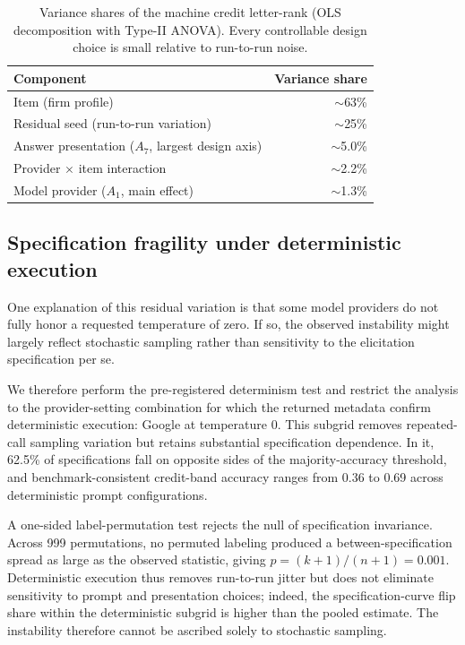 \documentclass[pdflatex,sn-nature,lineno]{sn-jnl}
\theoremstyle{thmstyleone}
\begin{document}
\begin{table}[t]\centering
\caption{Variance shares of the machine credit letter-rank (OLS decomposition with Type-II ANOVA). Every
controllable design choice is small relative to run-to-run noise.}\label{tab:var}
\begin{tabular}{lr}\toprule
Component & Variance share \\\midrule
Item (firm profile) & $\sim$63\% \\
Residual seed (run-to-run variation) & $\sim$25\% \\
Answer presentation ($A_7$, largest design axis) & $\sim$5.0\% \\
Provider $\times$ item interaction & $\sim$2.2\% \\
Model provider ($A_1$, main effect) & $\sim$1.3\% \\\bottomrule
\end{tabular}\end{table}

\subsection{Specification fragility under deterministic execution}
One explanation of this residual variation is that some model providers do not fully honor a requested
temperature of zero. If so, the observed instability might largely reflect stochastic sampling rather
than sensitivity to the elicitation specification per se.

We therefore perform the pre-registered determinism test and restrict the analysis to the
provider-setting combination for which the returned metadata confirm deterministic execution: Google at
temperature 0. This subgrid removes repeated-call sampling variation but retains substantial
specification dependence. In it, 62.5\% of specifications fall on opposite sides of the majority-accuracy
threshold, and benchmark-consistent credit-band accuracy ranges from 0.36 to 0.69 across deterministic
prompt configurations.

A one-sided label-permutation test rejects the null of specification invariance. Across 999 permutations,
no permuted labeling produced a between-specification spread as large as the observed statistic, giving
$p=(k{+}1)/(n{+}1)=0.001$. Deterministic execution thus removes run-to-run jitter but does not eliminate
sensitivity to prompt and presentation choices; indeed, the specification-curve flip share within the
deterministic subgrid is higher than the pooled estimate. The instability therefore cannot be ascribed
solely to stochastic sampling.
\end{document}
